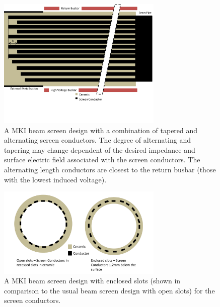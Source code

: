 \begin{figure}
\begin{center}
\includegraphics[width=0.7\textwidth]{LHC_MKI/figures/mki-design-layouts/combination_layout.pdf}
\end{center}
\caption{A MKI beam screen design with a combination of tapered and alternating screen conductors. The degree of alternating and tapering may change dependent of the desired impedance and surface electric field associated with the screen conductors. The alternating length conductors are closest to the return busbar (those with the lowest induced voltage).}
\label{fig:24-alternating-tapered}
\end{figure}

\begin{figure}
\begin{center}
\includegraphics[width=0.7\textwidth]{LHC_MKI/figures/mki-design-layouts/enclosed_diagram.pdf}
\end{center}
\caption{A MKI beam screen design with enclosed slots (shown in comparison to the usual beam screen design with open slots) for the screen conductors.}
\label{fig:24-enclosed-slots}
\end{figure}

